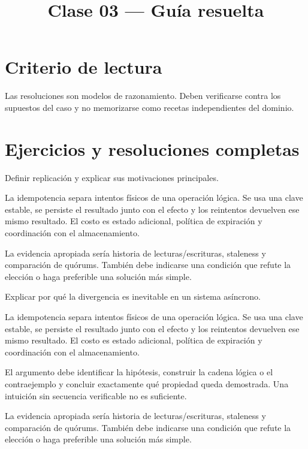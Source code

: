 \documentclass[variant=guia,cover=institutional,mode=screen]{ua-engineering-v6-article}
\title{Clase 03 --- Guía resuelta}
\author{\UAProfessor}
\date{\UADate}
\begin{document}
\section{Criterio de lectura}
Las resoluciones son modelos de razonamiento. Deben verificarse contra los supuestos del caso y no memorizarse como recetas independientes del dominio.

\section{Ejercicios y resoluciones completas}
\begin{uaexercise}
Definir replicación y explicar sus motivaciones principales.
\end{uaexercise}
\begin{uaanswer}
La idempotencia separa intentos físicos de una operación lógica. Se usa una clave estable, se persiste el resultado junto con el efecto y los reintentos devuelven ese mismo resultado. El costo es estado adicional, política de expiración y coordinación con el almacenamiento.

La evidencia apropiada sería historia de lecturas/escrituras, staleness y comparación de quórums. También debe indicarse una condición que refute la elección o haga preferible una solución más simple.
\end{uaanswer}

\begin{uaexercise}
Explicar por qué la divergencia es inevitable en un sistema asíncrono.
\end{uaexercise}
\begin{uaanswer}
La idempotencia separa intentos físicos de una operación lógica. Se usa una clave estable, se persiste el resultado junto con el efecto y los reintentos devuelven ese mismo resultado. El costo es estado adicional, política de expiración y coordinación con el almacenamiento.

El argumento debe identificar la hipótesis, construir la cadena lógica o el contraejemplo y concluir exactamente qué propiedad queda demostrada. Una intuición sin secuencia verificable no es suficiente.

La evidencia apropiada sería historia de lecturas/escrituras, staleness y comparación de quórums. También debe indicarse una condición que refute la elección o haga preferible una solución más simple.
\end{uaanswer}
\end{document}
